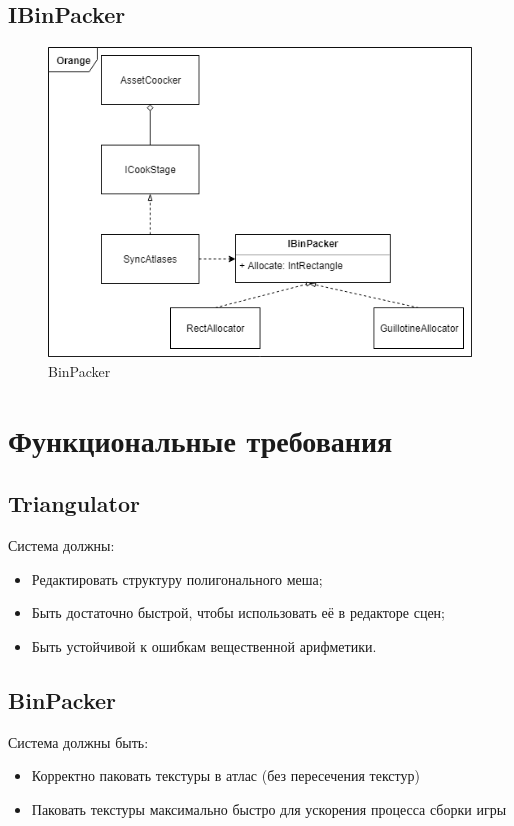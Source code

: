 \documentclass{fefu}
\begin{document}
\subsection{IBinPacker}
\begin{figure}[H]
    \centering
    \includegraphics{images/BinPacker.png}
    \caption{BinPacker}
    \label{BinPacker}
\end{figure}
\section{Функциональные требования}
\subsection{Triangulator}
Система должны:
\begin{itemize}
    \item Редактировать структуру полигонального меша;
    \item Быть достаточно быстрой, чтобы использовать её в редакторе сцен;
    \item Быть устойчивой к ошибкам вещественной арифметики.
\end{itemize}
\subsection{BinPacker}
Система должны быть:
\begin{itemize}
    \item Корректно паковать текстуры в атлас (без пересечения текстур)
    \item Паковать текстуры максимально быстро для ускорения процесса сборки игры
\end{itemize}
\end{document}
